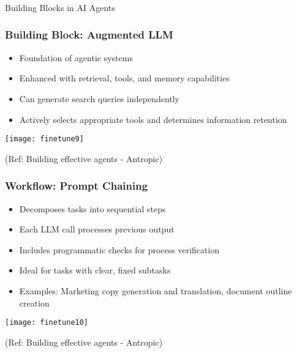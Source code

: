 \begin{frame}[fragile]\frametitle{}
\begin{center}
{\Large Building Blocks in AI Agents}

\end{center}
\end{frame}

\begin{frame}[fragile]\frametitle{Building Block: Augmented LLM}
    \begin{itemize}
        \item Foundation of agentic systems
        \item Enhanced with retrieval, tools, and memory capabilities
        \item Can generate search queries independently
        \item Actively selects appropriate tools and determines information retention
    \end{itemize}
	
	\begin{center}
	\texttt{[image: finetune9]}
	\end{center}

	{\tiny (Ref: Building effective agents - Antropic)}
	
\end{frame}

\begin{frame}[fragile]\frametitle{Workflow: Prompt Chaining}
    \begin{itemize}
        \item Decomposes tasks into sequential steps
        \item Each LLM call processes previous output
        \item Includes programmatic checks for process verification
        \item Ideal for tasks with clear, fixed subtasks
        \item Examples: Marketing copy generation and translation, document outline creation
    \end{itemize}
	
	\begin{center}
	\texttt{[image: finetune10]}
	\end{center}

	{\tiny (Ref: Building effective agents - Antropic)}	
\end{frame}


